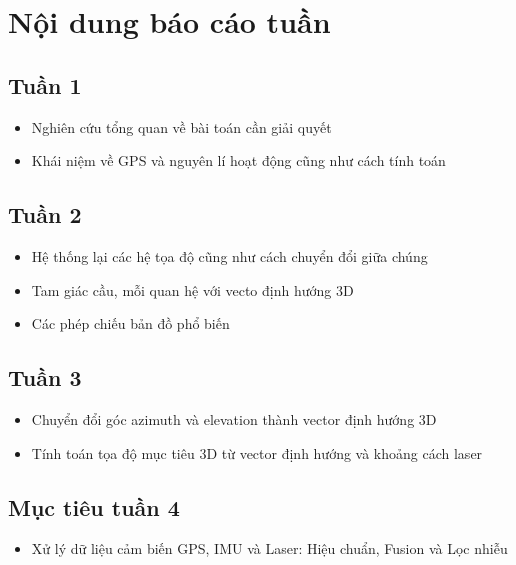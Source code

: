 \section*{Nội dung báo cáo tuần}
\thispagestyle{empty}

\subsection*{Tuần 1}
\begin{itemize}
    \item Nghiên cứu tổng quan về bài toán cần giải quyết
    \item Khái niệm về GPS và nguyên lí hoạt động cũng như cách tính toán
\end{itemize}
\subsection*{Tuần 2}
\begin{itemize}
    \item Hệ thống lại các hệ tọa độ cũng như cách chuyển đổi giữa chúng
    \item Tam giác cầu, mỗi quan hệ với vecto định hướng 3D
    \item Các phép chiếu bản đồ phổ biến
\end{itemize}

\subsection*{Tuần 3}

\begin{itemize}
    \item Chuyển đổi góc azimuth và elevation thành vector định hướng 3D
    \item Tính toán tọa độ mục tiêu 3D từ vector định hướng và khoảng cách laser
\end{itemize}

\subsection*{Mục tiêu tuần 4}
\begin{itemize}
    \item Xử lý dữ liệu cảm biến GPS, IMU và Laser: Hiệu chuẩn, Fusion và Lọc nhiễu
\end{itemize}

\clearpage
{}

